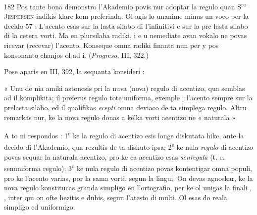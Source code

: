\begin{VUpage}[186]{182}
Pos tante bona demonstro l'Akademio povis nur adoptar\nl
la regulo quan S\textsuperscript{ro} \textsc{Jespersen} indikis klare kom preferinda.\nl
Ol agis lo unanime minus un voco per la decido 57 :\nl
L'acento esas sur la lasta silabo di l'infinitivi e sur la pre\cc
lasta silabo di la cetera vorti. Ma en plursilaba radiki, i e u\nl
nemediate avan vokalo ne povas ricevar (recevar) l'acento.\nl
Konseque omna radiki finanta nun per y pos konsonanto\nl
chanjos ol ad i. (\textit{Progreso}, III, 322.)

Pose aparis en III, 392, la sequanta konsideri :

« Unu de nia amiki astonesis pri la nuva (nova) regulo\nl
di acentizo, qua semblas ad il komplikita; il preferus regulo\nl
tote uniforma, exemple : l'acento sempre sur la prelasta\nl
silabo, ed il qualifikas \textit{ecepti} omna deviaco de ta simplega\nl
regulo. Altru remarkas nur, ke la nova regulo donas a kelka\nl
vorti acentizo ne « naturala ».

A to ni respondos : 1\textsuperscript{e} ke la regulo di acentizo esis longe\nl
diskutata hike, ante la decido di l'Akademio, qua rezultis\nl
de ta diskuto ipsa; 2\textsuperscript{e} ke nula \textit{regulo} di acentizo povas\nl
sequar la naturala acentizo, pro ke ca acentizo esas \textit{senregula}\nl
(t. e. senuniforma regulo); 3\textsuperscript{e} ke nula regulo di acentizo\nl
povas kontentigar omna populi, pro ke l'acento varias, por\nl
la sama vorti, segun la lingui. On devas agnoskar, ke la\nl
nova regulo konstitucas granda simpligo en l'ortografio, per\nl
ke ol unigas la finali , , inter qui on ofte hezitis e\nl
dubis, segun l'atesto di multi. Ol esas do reala simpligo ed\nl
uniformigo.


\end{VUpage}
